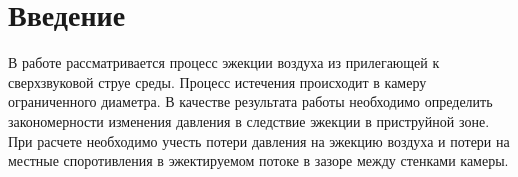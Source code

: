 \chapter{Введение}

В работе рассматривается процесс эжекции воздуха из прилегающей к сверхзвуковой струе среды. Процесс истечения происходит в камеру ограниченного диаметра. В качестве результата работы необходимо определить закономерности изменения давления в следствие эжекции в приструйной зоне. При расчете необходимо учесть потери давления на эжекцию воздуха и потери на местные споротивления в эжектируемом потоке в зазоре между стенками камеры.